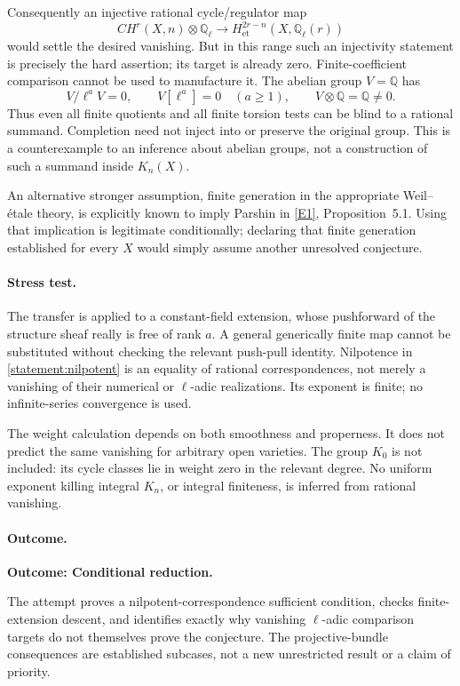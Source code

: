 \documentclass[11pt,a4paper]{article}
\newcommand{\Q}{\mathbb{Q}}
\newcommand{\eref}[2]{\hyperlink{extra:#1:#2}{[E#2]}}
\numberwithin{equation}{section}
\begin{document}
Consequently an injective rational cycle/regulator map
\[
 CH^r(X,n)\otimes\Q_\ell\longrightarrow
 H^{2r-n}_{\mathrm{et}}(X,\Q_\ell(r))
\]
would settle the desired vanishing. But in this range such an injectivity
statement is precisely the hard assertion; its target is already zero.
Finite-coefficient comparison cannot be used to manufacture it. The
abelian group $V=\Q$ has
\[
 V/\ell^aV=0,\qquad V[\ell^a]=0\quad(a\ge1),
 \qquad V\otimes\Q=\Q\ne0.
\]
Thus even all finite quotients and all finite torsion tests can be blind
to a rational summand. Completion need not inject into or preserve the
original group. This is a counterexample to an inference about abelian
groups, not a construction of such a summand inside $K_n(X)$.

An alternative stronger assumption, finite generation in the appropriate
Weil--\'etale theory, is explicitly known to imply Parshin in
\eref{statement}{1}, Proposition~5.1. Using that implication is legitimate
conditionally; declaring that finite generation established for every
$X$ would simply assume another unresolved conjecture.

\paragraph{Stress test.}
The transfer is applied to a constant-field extension, whose pushforward
of the structure sheaf really is free of rank $a$. A general generically
finite map cannot be substituted without checking the relevant
push-pull identity. Nilpotence in \eqref{statement:nilpotent} is an equality
of rational correspondences, not merely a vanishing of their numerical
or $\ell$-adic realizations. Its exponent is finite; no infinite-series
convergence is used.

The weight calculation depends on both smoothness and properness. It
does not predict the same vanishing for arbitrary open varieties.
The group $K_0$ is not included: its cycle classes lie in weight zero
in the relevant degree. No uniform exponent killing integral $K_n$, or
integral finiteness, is inferred from rational vanishing.

\paragraph{Outcome.}
\textbf{Outcome: Conditional reduction.}

The attempt proves a nilpotent-correspondence sufficient condition,
checks finite-extension descent, and identifies exactly why vanishing
$\ell$-adic comparison targets do not themselves prove the conjecture.
The projective-bundle consequences are established subcases, not a new
unrestricted result or a claim of priority.
\end{document}
